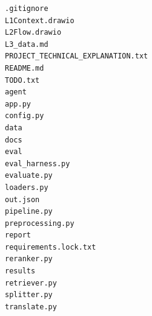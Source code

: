 \begin{lstlisting}
.gitignore
L1Context.drawio
L2Flow.drawio
L3_data.md
PROJECT_TECHNICAL_EXPLANATION.txt
README.md
TODO.txt
agent
app.py
config.py
data
docs
eval
eval_harness.py
evaluate.py
loaders.py
out.json
pipeline.py
preprocessing.py
report
requirements.lock.txt
reranker.py
results
retriever.py
splitter.py
translate.py
\end{lstlisting}
